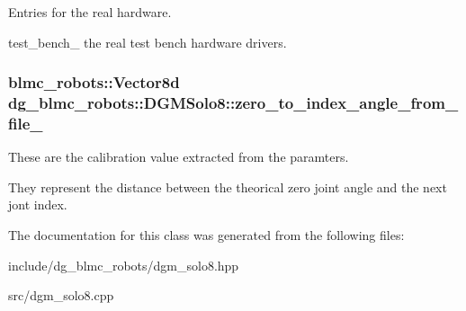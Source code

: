Entries for the real hardware. 

test\+\_\+bench\+\_\+ the real test bench hardware drivers. 
\subsubsection[{\texorpdfstring{zero\+\_\+to\+\_\+index\+\_\+angle\+\_\+from\+\_\+file\+\_\+}{zero_to_index_angle_from_file_}}]{\setlength{\rightskip}{0pt plus 5cm}blmc\+\_\+robots\+::\+Vector8d dg\+\_\+blmc\+\_\+robots\+::\+D\+G\+M\+Solo8\+::zero\+\_\+to\+\_\+index\+\_\+angle\+\_\+from\+\_\+file\+\_\+\hspace{0.3cm}{\ttfamily [private]}}\hypertarget{classdg__blmc__robots_1_1DGMSolo8_a91b31486cb3fe3de16043f7fb4d6cc74}{}\label{classdg__blmc__robots_1_1DGMSolo8_a91b31486cb3fe3de16043f7fb4d6cc74}


These are the calibration value extracted from the paramters. 

They represent the distance between the theorical zero joint angle and the next jont index. 

The documentation for this class was generated from the following files\+:\begin{DoxyCompactItemize}
\item 
include/dg\+\_\+blmc\+\_\+robots/dgm\+\_\+solo8.\+hpp\item 
src/dgm\+\_\+solo8.\+cpp\end{DoxyCompactItemize}
